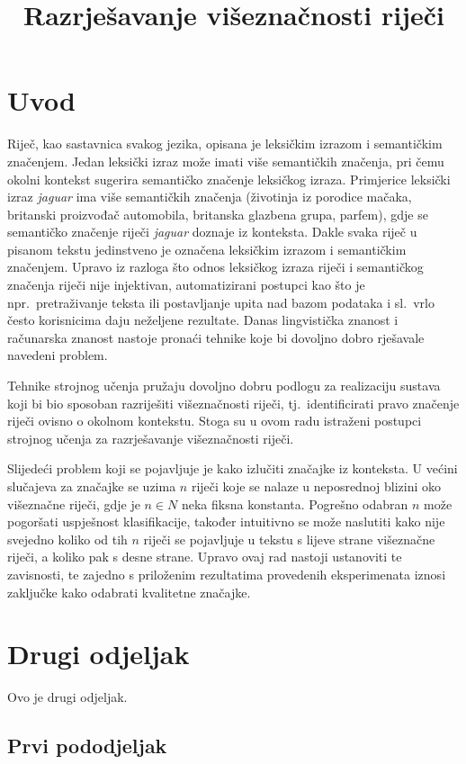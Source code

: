 \documentclass[10pt, a4paper]{article}
\title{Razrješavanje višeznačnosti riječi}
\begin{document}
\maketitleabstract

\section{Uvod}

Riječ, kao sastavnica svakog jezika, opisana je leksičkim izrazom i semantičkim značenjem.
Jedan leksički izraz može imati više semantičkih značenja, pri čemu okolni kontekst
sugerira semantičko značenje leksičkog izraza. 
Primjerice leksički izraz \emph{jaguar} ima više semantičkih značenja
(životinja iz porodice mačaka, britanski proizvođač automobila, 
britanska glazbena grupa, parfem), gdje se semantičko značenje riječi \emph{jaguar}
doznaje iz konteksta. Dakle svaka riječ u pisanom tekstu jedinstveno je označena 
leksičkim izrazom i semantičkim značenjem. Upravo iz razloga što odnos 
leksičkog izraza riječi i semantičkog značenja riječi nije injektivan, 
automatizirani postupci kao što je npr.~pretraživanje teksta ili
postavljanje upita nad bazom podataka i sl.~vrlo često korisnicima 
daju neželjene rezultate. Danas lingvistička znanost i računarska znanost 
nastoje pronaći tehnike koje bi dovoljno dobro 
rješavale navedeni problem.

Tehnike strojnog učenja pružaju dovoljno dobru podlogu za realizaciju sustava
koji bi bio sposoban razriješiti višeznačnosti riječi, tj.~identificirati pravo
značenje riječi ovisno o okolnom kontekstu. Stoga su u ovom radu istraženi postupci
strojnog učenja za razrješavanje višeznačnosti riječi.

Slijedeći problem koji se pojavljuje je kako izlučiti značajke iz konteksta.
U većini slučajeva za značajke se uzima $n$ riječi koje se nalaze u neposrednoj blizini oko višeznačne riječi, gdje je $n \in N$ neka fiksna konstanta. Pogrešno odabran $n$ može pogoršati uspješnost klasifikacije, također intuitivno se može naslutiti kako nije svejedno koliko od tih $n$ riječi se pojavljuje u tekstu s lijeve strane višeznačne riječi, a koliko pak s desne strane.
Upravo ovaj rad nastoji ustanoviti te zavisnosti, te zajedno s priloženim rezultatima provedenih eksperimenata iznosi zaključke kako odabrati kvalitetne značajke.
\section{Drugi odjeljak}

Ovo je drugi odjeljak.

\subsection{Prvi pododjeljak}
\label{sec:prvi}
\end{document}
